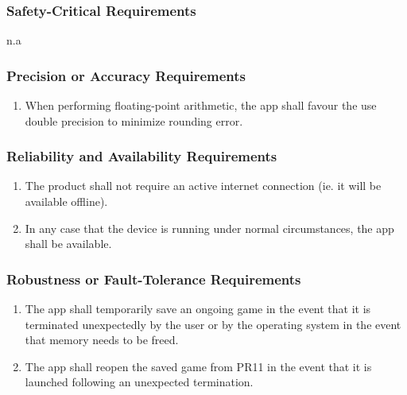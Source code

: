 \documentclass[]{article}
\begin{document}
\subsubsection{Safety-Critical Requirements}
\label{ssub:safety_critical_requirements}
n.a

\subsubsection{Precision or Accuracy Requirements}
\label{ssub:precision_or_accuracy_requirements}
\begin{enumerate}[{PR}1. ]
	\resumeEnum
	\item When performing floating-point arithmetic, the app shall favour the use double precision to minimize rounding error.
	\holdEnum
\end{enumerate}

\subsubsection{Reliability and Availability Requirements}
\label{ssub:reliability_and_availability_requirements}
\begin{enumerate}[{PR}1. ]
	\resumeEnum
	\item The product shall not require an active internet connection (ie. it will be available offline).
	\item In any case that the device is running under normal circumstances, the app shall be available.
	\holdEnum
\end{enumerate}

\subsubsection{Robustness or Fault-Tolerance Requirements}
\label{ssub:robustness_or_fault_tolerance_requirements}
\begin{enumerate}[{PR}1. ]
	\resumeEnum
	\item The app shall temporarily save an ongoing game in the event that it is terminated unexpectedly by the user or by the operating system in the event that memory needs to be freed. 
	\item The app shall reopen the saved game from PR11 in the event that it is launched following an unexpected termination.
	\holdEnum
\end{enumerate}
\end{document}
